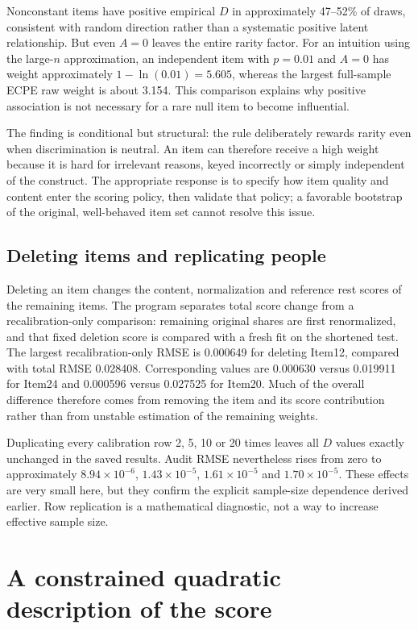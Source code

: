 \documentclass[11pt,a4paper,oneside,headings=normal,parskip=half]{scrreprt}
\begin{document}
Nonconstant items have positive empirical $D$ in approximately 47--52\% of draws, consistent with random direction rather than a systematic positive latent relationship. But even $A=0$ leaves the entire rarity factor. For an intuition using the large-$n$ approximation, an independent item with $p=0.01$ and $A=0$ has weight approximately $1-\ln(0.01)=5.605$, whereas the largest full-sample ECPE raw weight is about 3.154. This comparison explains why positive association is not necessary for a rare null item to become influential.

The finding is conditional but structural: the rule deliberately rewards rarity even when discrimination is neutral. An item can therefore receive a high weight because it is hard for irrelevant reasons, keyed incorrectly or simply independent of the construct. The appropriate response is to specify how item quality and content enter the scoring policy, then validate that policy; a favorable bootstrap of the original, well-behaved item set cannot resolve this issue.

\section{Deleting items and replicating people}
Deleting an item changes the content, normalization and reference rest scores of the remaining items. The program separates total score change from a recalibration-only comparison: remaining original shares are first renormalized, and that fixed deletion score is compared with a fresh fit on the shortened test. The largest recalibration-only RMSE is 0.000649 for deleting Item12, compared with total RMSE 0.028408. Corresponding values are 0.000630 versus 0.019911 for Item24 and 0.000596 versus 0.027525 for Item20. Much of the overall difference therefore comes from removing the item and its score contribution rather than from unstable estimation of the remaining weights.

Duplicating every calibration row 2, 5, 10 or 20 times leaves all $D$ values exactly unchanged in the saved results. Audit RMSE nevertheless rises from zero to approximately $8.94\times10^{-6}$, $1.43\times10^{-5}$, $1.61\times10^{-5}$ and $1.70\times10^{-5}$. These effects are very small here, but they confirm the explicit sample-size dependence derived earlier. Row replication is a mathematical diagnostic, not a way to increase effective sample size.

\chapter{A constrained quadratic description of the score}\label{ch:regression}
\end{document}
